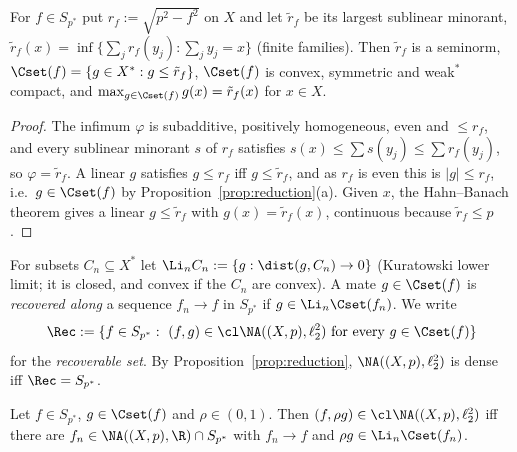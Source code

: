 \begin{proposition}\label{prop:primal}
For $f\in S_{p^*}$ put $r_f:=\sqrt{p^2-f^2}$ on $X$ and let $\tilde r_f$ be
its largest sublinear minorant,
$\tilde r_f(x)=\inf\{\sum_jr_f(y_j):\sum_jy_j=x\}$ \textup{(}finite
families\textup{)}.  Then $\tilde r_f$ is a seminorm,
$\Cset(f)=\{g\in X^*:g\le\tilde r_f\}$, $\Cset(f)$ is convex, symmetric
and weak$^*$ compact, and $\max_{g\in\Cset(f)}g(x)=\tilde r_f(x)$ for
$x\in X$.
\end{proposition}

\begin{proof}
The infimum $\varphi$ is subadditive, positively homogeneous, even and
$\le r_f$, and every sublinear minorant $s$ of $r_f$ satisfies
$s(x)\le\sum s(y_j)\le\sum r_f(y_j)$, so $\varphi=\tilde r_f$.  A linear $g$
satisfies $g\le r_f$ iff $g\le\tilde r_f$, and as $r_f$ is even this is
$|g|\le r_f$, i.e.\ $g\in\Cset(f)$ by Proposition~\ref{prop:reduction}(a).
Given $x$, the Hahn--Banach theorem gives a linear $g\le\tilde r_f$ with
$g(x)=\tilde r_f(x)$, continuous because $\tilde r_f\le p$.
\end{proof}

\begin{definition}[Recovery]\label{def:recovery}
For subsets $C_n\subseteq X^*$ let
$\Li_nC_n:=\{g:\dist(g,C_n)\to0\}$ (Kuratowski lower limit; it is closed,
and convex if the $C_n$ are convex).  A mate $g\in\Cset(f)$ is
\emph{recovered along} a sequence $f_n\to f$ in $S_{p^*}$ if
$g\in\Li_n\Cset(f_n)$.  We write
\[
 \Rec:=\{f\in S_{p^*}:\ (f,g)\in\cl\NA((X,p),\ell_2^2)\text{ for every }
 g\in\Cset(f)\}
\]
for the \emph{recoverable set}.  By Proposition~\ref{prop:reduction},
$\NA((X,p),\ell_2^2)$ is dense iff $\Rec=S_{p^*}$.
\end{definition}

\begin{lemma}\label{lem:pair}
Let $f\in S_{p^*}$, $g\in\Cset(f)$ and $\rho\in(0,1)$.  Then
$(f,\rho g)\in\cl\NA((X,p),\ell_2^2)$ iff there are
$f_n\in\NA((X,p),\R)\cap S_{p^*}$ with $f_n\to f$ and
$\rho g\in\Li_n\Cset(f_n)$.
\end{lemma}

